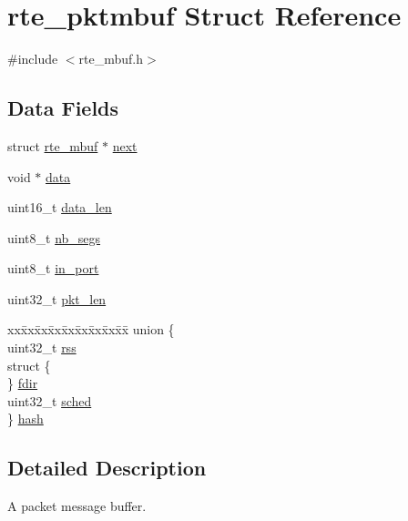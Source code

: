 \hypertarget{structrte__pktmbuf}{}\section{rte\+\_\+pktmbuf Struct Reference}
\label{structrte__pktmbuf}


{\ttfamily \#include $<$rte\+\_\+mbuf.\+h$>$}

\subsection*{Data Fields}
\begin{DoxyCompactItemize}
\item 
struct \hyperlink{structrte__mbuf}{rte\+\_\+mbuf} $\ast$ \hyperlink{structrte__pktmbuf_ac858fb3bb1a1d67a6efc9563d0c5a471}{next}
\item 
void $\ast$ \hyperlink{structrte__pktmbuf_a735984d41155bc1032e09bece8f8d66d}{data}
\item 
uint16\+\_\+t \hyperlink{structrte__pktmbuf_ad1a572736a10ff6b282c5f43c4ea1ccf}{data\+\_\+len}
\item 
uint8\+\_\+t \hyperlink{structrte__pktmbuf_a54163d61074a843b5a9560b74f7d3581}{nb\+\_\+segs}
\item 
uint8\+\_\+t \hyperlink{structrte__pktmbuf_ab49c6f120dff383ff203d3b6681f76ca}{in\+\_\+port}
\item 
uint32\+\_\+t \hyperlink{structrte__pktmbuf_a5046af233a45d6d79ce1a5aae535b23c}{pkt\+\_\+len}
\item 
\begin{tabbing}
xx\=xx\=xx\=xx\=xx\=xx\=xx\=xx\=xx\=\kill
union \{\\
\>uint32\_t \hyperlink{structrte__pktmbuf_aa4ca178cafee9969f22897e1a90a1cfa}{rss}\\
\>struct \{\\
\>\} \hyperlink{structrte__pktmbuf_a4228b21a34bc8766683ad1e9bc24dd3c}{fdir}\\
\>uint32\_t \hyperlink{structrte__pktmbuf_ac13bd4c368ee023f5dcf76070392323e}{sched}\\
\} \hyperlink{structrte__pktmbuf_a1afb10272967497f519ad87f70ef543a}{hash}\\

\end{tabbing}\end{DoxyCompactItemize}


\subsection{Detailed Description}
A packet message buffer. 

